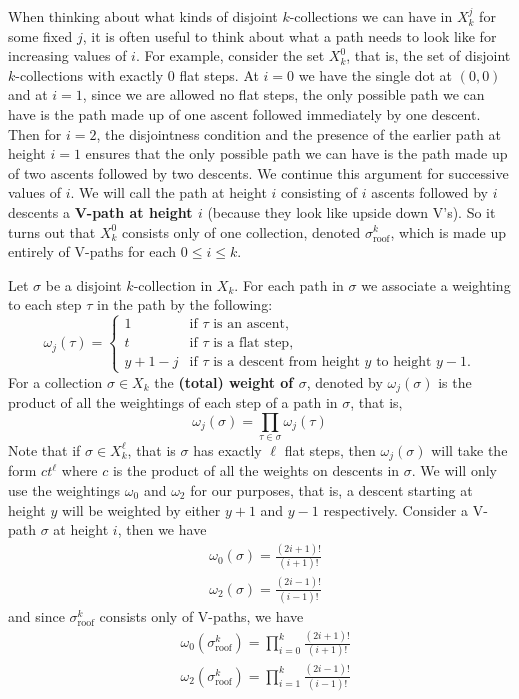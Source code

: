 \documentclass[11pt]{article}
\theoremstyle{definition}
\theoremstyle{definition}
\theoremstyle{plain}
\theoremstyle{plain}
\theoremstyle{plain}
\theoremstyle{definition}
\begin{document}
When thinking about what kinds of disjoint $k$-collections we can have in $X_k^j$ for some fixed $j$, it is often useful to think about what a path needs to look like for increasing values of $i$. For example, consider the set $X_k^0$, that is, the set of disjoint $k$-collections with exactly 0 flat steps. At $i = 0$ we have the single dot at $(0,0)$ and at $i = 1$, since we are allowed no flat steps, the only possible path we can have is the path made up of one ascent followed immediately by one descent. Then for $i = 2$, the disjointness condition and the presence of the earlier path at height $i=1$ ensures that the only possible path we can have is the path made up of two ascents followed by two descents. We continue this argument for successive values of $i$. We will call the path at height $i$ consisting of $i$ ascents followed by $i$ descents a \textbf{V-path at height $i$} (because they look like upside down V's). So it turns out that $X_k^0$ consists only of one collection, denoted $\sigma_{\text{roof}}^k$, which is made up entirely of V-paths for each $0\leq i\leq k$.

Let $\sigma$ be a disjoint $k$-collection in $X_k$. For each path in $\sigma$ we associate a weighting to each step $\tau$ in the path by the following:
\begin{equation*}
\omega_j(\tau) = \begin{cases} 
1 &\text{if $\tau$ is an ascent,} \\
t &\text{if $\tau$ is a flat step,} \\
y+1-j &\text{if $\tau$ is a descent from height $y$ to height $y-1$.}
\end{cases}
\end{equation*}
For a collection $\sigma\in X_k$ the \textbf{(total) weight of $\sigma$}, denoted by $\omega_j(\sigma)$ is the product of all the weightings of each step of a path in $\sigma$, that is,
\begin{equation*}
\omega_j(\sigma) = \prod\limits_{\tau\in\sigma}\omega_j(\tau)
\end{equation*}
Note that if $\sigma \in X_k^\ell$, that is $\sigma$ has exactly $\ell$ flat steps, then $\omega_j(\sigma)$ will take the form $ct^\ell$ where $c$ is the product of all the weights on descents in $\sigma$. We will only use the weightings $\omega_0$ and $\omega_2$ for our purposes, that is, a descent starting at height $y$ will be weighted by either $y+1$ and $y-1$ respectively. Consider a V-path $\sigma$ at height $i$, then we have
\begin{align*}
&\omega_0(\sigma) = \frac{(2i+1)!}{(i+1)!} \\
&\omega_2(\sigma) = \frac{(2i-1)!}{(i-1)!}
\end{align*}
and since $\sigma_{\text{roof}}^k$ consists only of V-paths, we have
\begin{align*}
&\omega_0\left(\sigma_{\text{roof}}^k\right) = \prod\limits_{i=0}^k\frac{(2i+1)!}{(i+1)!} \\
&\omega_2\left(\sigma_{\text{roof}}^k\right) = \prod\limits_{i=1}^k\frac{(2i-1)!}{(i-1)!} \\
\end{align*}
\end{document}
